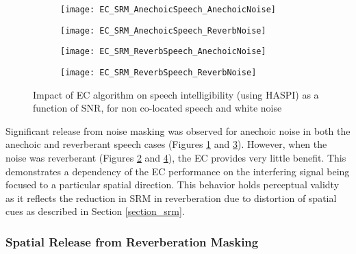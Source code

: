 \begin{figure}[H]
	\centering
	\begin{subfigure}[b]{0.49\textwidth}
		\centering
		\texttt{[image: EC\_SRM\_AnechoicSpeech\_AnechoicNoise]}
		\label{subfig:EC_SRM_SNR_anechoicS_anechoicN}
	\end{subfigure}
	\hfill
	\begin{subfigure}[b]{0.49\textwidth}
		\centering
		\texttt{[image: EC\_SRM\_AnechoicSpeech\_ReverbNoise]}
		\label{subfig:EC_SRM_SNR_anechoicS_reverbN}
	\end{subfigure}
	\hfill
	\begin{subfigure}[b]{0.49\textwidth}
		\centering
		\texttt{[image: EC\_SRM\_ReverbSpeech\_AnechoicNoise]}
		\label{subfig:EC_SRM_SNR_reverbS_anechoicN}
	\end{subfigure}
	\hfill
	\begin{subfigure}[b]{0.49\textwidth}
		\centering
		\texttt{[image: EC\_SRM\_ReverbSpeech\_ReverbNoise]}
		\label{subfig:EC_SRM_SNR_reverbS_reverbN}
	\end{subfigure}
	\hfill
	\caption[Impact of reverberation on EC spatial release from masking]{Impact of EC algorithm on speech intelligibility (using HASPI) as a function of SNR, for non co-located speech and white noise}
	\label{fig:EC_SRM_SNR}
\end{figure}

Significant release from noise masking was observed for anechoic noise in both the anechoic and reverberant speech cases (Figures \ref{subfig:EC_SRM_SNR_anechoicS_anechoicN} and \ref{subfig:EC_SRM_SNR_reverbS_anechoicN}). However, when the noise was reverberant (Figures \ref{subfig:EC_SRM_SNR_anechoicS_reverbN} and \ref{subfig:EC_SRM_SNR_reverbS_reverbN}), the EC provides very little benefit. This demonstrates a dependency of the EC performance on the interfering signal being focused to a particular spatial direction. This behavior holds perceptual validty as it reflects the reduction in SRM in reverberation due to distortion of spatial cues as described in Section \ref{section_srm}.

\subsubsection{Spatial Release from Reverberation Masking}

